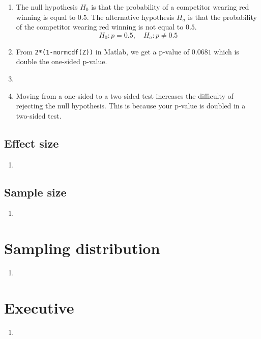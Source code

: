 \documentclass{article}
\begin{document}
\begin{enumerate}[label=\alph*.]
\begin{figure}
\end{figure}
    \item The null hypothesis $H_0$ is that the probability of a competitor wearing red winning is equal to $0.5$. The alternative hypothesis $H_a$ is that the probability of the competitor wearing red winning is not equal to $0.5$.
        $$H_0: p = 0.5, \quad H_a: p \neq 0.5$$
    \item From \texttt{2*(1-normcdf(Z))} in Matlab, we get a p-value of $0.0681$ which is double the one-sided p-value.
    \item 
    \item Moving from a one-sided to a two-sided test increases the difficulty of rejecting the null hypothesis. This is because your p-value is doubled in a two-sided test. 

\end{enumerate}

\subsection{Effect size}%
\label{sub:Effect size}
\begin{enumerate}[label=\alph*.]
    \item 
\end{enumerate}

\subsection{Sample size}%
\label{sub:Sample size}
\begin{enumerate}[label=\alph*.]
    \item 
\end{enumerate}

\section{Sampling distribution}%
\label{sec:Sampling distribution}
\begin{enumerate}[label=\alph*.]
    \item 
\end{enumerate}


\section{Executive}%
\label{sec:Executive}
\begin{enumerate}[label=\alph*.]
    \item 
\end{enumerate}
\end{document}
